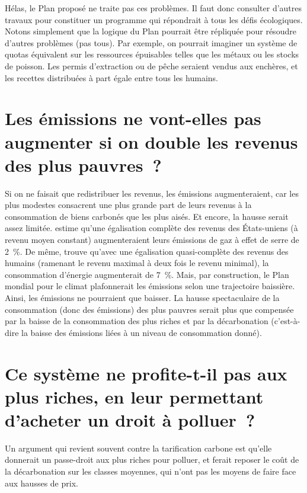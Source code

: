 \documentclass[a5paper,french,openany]{memoir}
\begin{document}
Hélas, le Plan proposé ne traite pas ces problèmes. Il faut donc consulter d'autres travaux pour constituer un programme qui répondrait à tous les défis écologiques. %
Notons simplement que la logique du Plan pourrait être répliquée pour résoudre d'autres problèmes (pas tous). Par exemple, on pourrait imaginer un système de quotas équivalent sur les ressources épuisables telles que les métaux ou les stocks de poisson. Les permis d'extraction %
ou de pêche seraient vendus aux enchères, et les recettes distribuées à part égale entre tous les humains.

\section*{\normalsize Les émissions ne vont-elles pas augmenter si on double les revenus des plus pauvres~?}\label{q:emissions}

Si on ne faisait que redistribuer les revenus, les émissions augmenteraient, car les plus modestes consacrent une plus grande part de leurs revenus à la consommation de biens carbonés que les plus aisés. Et encore, la hausse serait assez limitée. \cite{sager_income_2019} estime qu'une égalisation complète des revenus des États-uniens (à revenu moyen constant) augmenteraient leurs émissions de gaz à effet de serre de 2~\%. De même, \cite{oswald_global_2021} trouve qu'avec une égalisation quasi-complète des revenus des humains (ramenant le revenu maximal à deux fois le revenu minimal), la consommation d'énergie augmenterait de 7~\%. 
Mais, par construction, le Plan mondial pour le climat plafonnerait les émissions selon une trajectoire baissière. Ainsi, les émissions ne pourraient que baisser. La hausse spectaculaire de la consommation (donc des émissions) des plus pauvres serait plus que compensée par la baisse de la consommation des plus riches et par la décarbonation (c'est-à-dire la baisse des émissions liées à un niveau de consommation donné).

\section*{\normalsize Ce système ne profite-t-il pas aux plus riches, en leur permettant d'acheter un droit à polluer~?}\label{q:riches}

Un argument qui revient souvent contre la tarification carbone est qu'elle donnerait un passe-droit aux plus riches pour polluer, et ferait reposer le coût de la décarbonation sur les classes moyennes, qui n'ont pas les moyens de faire face aux hausses de prix. 
\end{document}
